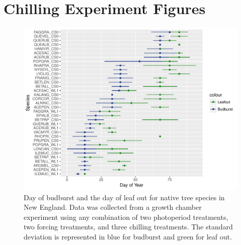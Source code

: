 \documentclass{article}\usepackage[]{graphicx}\usepackage[]{color}
\begin{document}
\renewcommand{\thetable}{\arabic{table}}
\renewcommand{\thefigure}{\arabic{figure}}
\renewcommand{\labelitemi}{$-$}
\section*{Chilling Experiment Figures}

\begin{figure} [H]
\begin{center}
\caption{Day of budburst and the day of leaf out for native tree species in New England. Data was collected from a growth chamber experiment using any combination of two photoperiod treatments, two forcing treatments, and three chilling treatments. The standard deviation is represented in blue for budburst and green for leaf out. }
\includegraphics{..//output/Dan_TXandSp.pdf} 
\end{center}
\end{figure}
\end{document}
